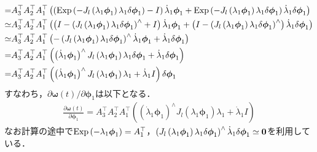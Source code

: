 \begin{align}
\begin{split}
    = & A_{3}^{\top} A_{2}^{\top} A_{1}^{\top} \left( \left( {\rm Exp} \left( -J_{l} \left( \lambda_{1} \boldsymbol \phi_{1} \right) \lambda_{1} \delta \boldsymbol \phi_{1} \right) - I \right) \dot{ \lambda}_{1} \boldsymbol \phi_{1} + {\rm Exp} \left( -J_{l} \left( \lambda_{1} \boldsymbol \phi_{1} \right) \lambda_{1} \delta \boldsymbol \phi_{1} \right) \dot{ \lambda }_{1} \delta \boldsymbol \phi_{1} \right) \\
    \simeq & A_{3}^{\top} A_{2}^{\top} A_{1}^{\top} \left( \left( I - \left( J_{l} \left( \lambda_{1} \boldsymbol \phi_{1} \right) \lambda_{1} \delta \boldsymbol \phi_{1} \right)^{\wedge} + I \right) \dot{ \lambda }_{1} \boldsymbol \phi_{1} + \left( I - \left( J_{l} \left( \lambda_{1} \boldsymbol \phi_{1} \right) \lambda_{1} \delta \boldsymbol \phi_{1}  \right)^{\wedge} \right) \dot{ \lambda }_{1} \delta \boldsymbol \phi_{1} \right) \\
    \simeq & A_{3}^{\top} A_{2}^{\top} A_{1}^{\top} \left( -\left( J_{l} \left( \lambda_{1} \boldsymbol \phi_{1} \right) \lambda_{1} \delta \boldsymbol \phi_{1} \right)^{\wedge} \dot{ \lambda }_{1} \boldsymbol \phi_{1} + \dot{ \lambda }_{1} \delta \boldsymbol \phi_{1} \right) \\
    = & A_{3}^{\top} A_{2}^{\top} A_{1}^{\top} \left( \left( \dot{ \lambda }_{1} \boldsymbol \phi_{1} \right)^{\wedge} J_{l} \left( \lambda_{1} \boldsymbol \phi_{1} \right) \lambda_{1} \delta \boldsymbol \phi_{1} + \dot{ \lambda }_{1} \delta \boldsymbol \phi_{1} \right) \\
    = & A_{3}^{\top} A_{2}^{\top} A_{1}^{\top} \left( \left( \dot{ \lambda }_{1} \boldsymbol \phi_{1} \right)^{\wedge} J_{l} \left( \lambda_{1} \boldsymbol \phi_{1} \right) \lambda_{1} + \dot{ \lambda }_{1} I \right) \delta \boldsymbol \phi_{1} \\
  \end{split}
\end{align}
%
すなわち，$\partial \boldsymbol \omega(t) / \partial \boldsymbol \phi_{1}$は以下となる．
%
\begin{align}
  \frac{ \partial \boldsymbol \omega(t) }{ \partial \boldsymbol \phi_{1} }
  =
  A_{3}^{\top} A_{2}^{\top} A_{1}^{\top} \left( \left( \dot{ \lambda }_{1} \boldsymbol \phi_{1} \right)^{\wedge} J_{l} \left( \lambda_{1} \boldsymbol \phi_{1} \right) \lambda_{1} + \dot{ \lambda }_{1} I \right)
\end{align}
%
なお計算の途中で${\rm Exp} \left( -\lambda_{1} \boldsymbol \phi_{1} \right) = A_{1}^{\top}$，$\left( J_{l} \left( \lambda_{1} \boldsymbol \phi_{1} \right) \lambda_{1} \delta \boldsymbol \phi_{1}  \right)^{\wedge} \dot{ \lambda }_{1} \delta \boldsymbol \phi_{1} \simeq {\bf 0}$を利用している．
